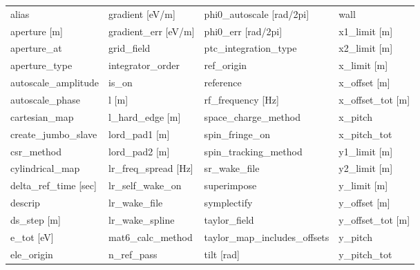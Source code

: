  \begin{tabular}{llll} \toprule
alias                          & gradient [eV/m]                & phi0_autoscale [rad/2pi]       & wall                           \\
aperture [m]                   & gradient_err [eV/m]            & phi0_err [rad/2pi]             & x1_limit [m]                   \\
aperture_at                    & grid_field                     & ptc_integration_type           & x2_limit [m]                   \\
aperture_type                  & integrator_order               & ref_origin                     & x_limit [m]                    \\
autoscale_amplitude            & is_on                          & reference                      & x_offset [m]                   \\
autoscale_phase                & l [m]                          & rf_frequency [Hz]              & x_offset_tot [m]               \\
cartesian_map                  & l_hard_edge [m]                & space_charge_method            & x_pitch                        \\
create_jumbo_slave             & lord_pad1 [m]                  & spin_fringe_on                 & x_pitch_tot                    \\
csr_method                     & lord_pad2 [m]                  & spin_tracking_method           & y1_limit [m]                   \\
cylindrical_map                & lr_freq_spread [Hz]            & sr_wake_file                   & y2_limit [m]                   \\
delta_ref_time [sec]           & lr_self_wake_on                & superimpose                    & y_limit [m]                    \\
descrip                        & lr_wake_file                   & symplectify                    & y_offset [m]                   \\
ds_step [m]                    & lr_wake_spline                 & taylor_field                   & y_offset_tot [m]               \\
e_tot [eV]                     & mat6_calc_method               & taylor_map_includes_offsets    & y_pitch                        \\
ele_origin                     & n_ref_pass                     & tilt [rad]                     & y_pitch_tot                    \\

\end{tabular}
